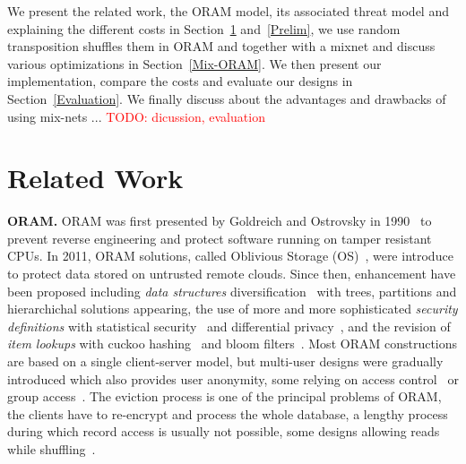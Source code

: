 \documentclass[USenglish,oneside,twocolumn]{article}
\newcommand{\todo}[1]{\textcolor{red}{TODO: #1}}
\begin{document}
We present the related work, the ORAM model, its associated threat model and explaining the different costs in Section~\ref{Related} and~\ref{Prelim}, we use random transposition shuffles them in ORAM and together with a mixnet and discuss various optimizations in Section~\ref{Mix-ORAM}. We then present our implementation, compare the costs and evaluate our designs in Section~\ref{Evaluation}.
We finally discuss about the advantages and drawbacks of using mix-nets ... \todo{dicussion, evaluation}
%

\section{Related Work}\label{Related}
\noindent\textbf{ORAM.}
ORAM was first presented by Goldreich and Ostrovsky in 1990~\cite{ostrovsky1990efficient} to prevent reverse engineering and protect software running on tamper resistant CPUs. In 2011, ORAM solutions, called Oblivious Storage (OS)~\cite{boneh2011}, were introduce to protect data stored on untrusted remote clouds.
Since then, enhancement have been proposed including \textit{data structures} diversification~\cite{goldreich1996software,stefanov2011towards,stefanov2013path,ren2014ring} with trees, partitions and hierarchichal solutions appearing,
the use of more and more sophisticated \textit{security definitions} with statistical security~\cite{damgaard2011perfectly,ajtai2010oblivious} and differential privacy~\cite{wagh2016root}, and the revision of \textit{item lookups} with cuckoo hashing~\cite{pinkas2010oblivious} and bloom filters~\cite{williams2008building}.
Most ORAM constructions are based on a single client-server model, but multi-user designs were gradually introduced \cite{backesanonymous}  which also provides user anonymity, some relying on access control~\cite{franz2011oblivious} or group access~\cite{goodrich2012privacy}.
The eviction process is one of the principal problems of ORAM, the clients have to re-encrypt and process the whole database, a lengthy process during which record access is usually not possible, some designs allowing reads while shuffling~\cite{boneh2011}.\\
\end{document}
